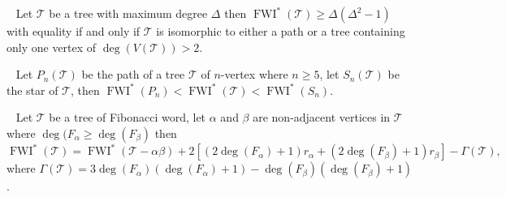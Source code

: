 \documentclass[10pt,a4paper]{amsart}
\begin{document}
\begin{proposition}~\label{pron1}
Let $\mathscr{T}$ be a tree with maximum degree $\Delta$ then $\operatorname{FWI}^*(\mathscr{T})\ge \Delta(\Delta^2 - 1)$ with equality if and only if $\mathscr{T}$ is isomorphic to either a path or a tree containing only one vertex of $\deg (V(\mathscr{T}))>2$.
\end{proposition}

\begin{proposition}~\label{pron2}
Let $P_n(\mathscr{T})$ be the path of a tree $\mathscr{T}$ of $n$-vertex where $n\geq 5$, let $S_n(\mathscr{T})$ be the star of $\mathscr{T}$, then $\operatorname{FWI}^* (P_n) < \operatorname{FWI}^*(\mathscr{T}) <\operatorname{FWI}^*(S_n)$.
\end{proposition}

\begin{lemma}~\label{lemn1}
Let $\mathscr{T}$ be a tree of Fibonacci word, let $\alpha$ and $\beta$ are non-adjacent vertices in $\mathscr{T}$ where $\deg(F_\alpha\ge \deg (F_\beta)$ then
\[
\operatorname{FWI}^*(\mathscr{T})=\operatorname{FWI}^*(\mathscr{T}-\alpha\beta)+2[(2\deg(F_\alpha)+1)r_\alpha+(2\deg(F_\beta)+1)r_\beta]-\Gamma(\mathscr{T}),
\]
where $\Gamma(\mathscr{T})=3\deg(F_\alpha)(\deg (F_\alpha)+1)-  \deg(F_\beta)(\deg (F_\beta)+1)$.
\end{lemma}
\end{document}
